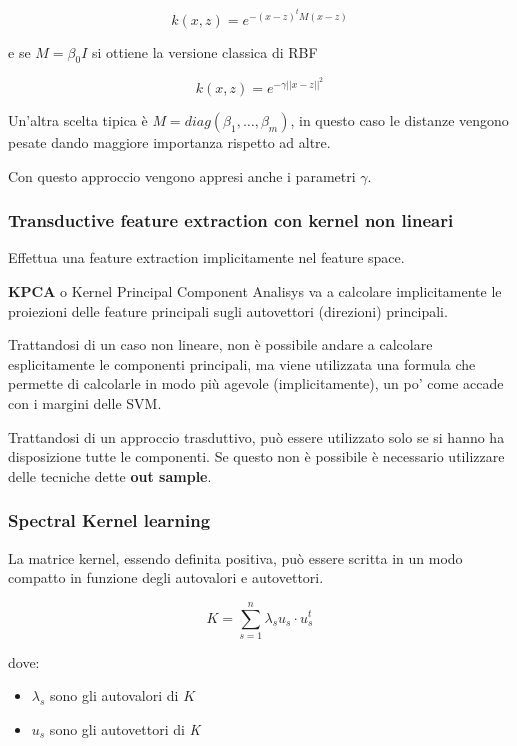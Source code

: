 $$
k(x,z) = e^{-(x-z)^t M(x-z)}
$$

e se $M = \beta_0 I$ si ottiene la versione classica di RBF

$$
k(x,z) =e^{-\gamma||x-z||^2}
$$

Un'altra scelta tipica è $M = diag(\beta_1, \ldots,\beta_m)$, in questo
caso le distanze vengono pesate dando maggiore importanza rispetto ad
altre.

Con questo approccio vengono appresi anche i parametri $\gamma$.

\subsubsection{Transductive feature extraction con kernel non
lineari}\label{transduction-feature-extraction-con-kernel-non-lineari}

Effettua una feature extraction implicitamente nel feature space.

\textbf{KPCA} o Kernel Principal Component Analisys va a calcolare
implicitamente le proiezioni delle feature principali sugli autovettori
(direzioni) principali.

Trattandosi di un caso non lineare, non è possibile andare a calcolare
esplicitamente le componenti principali, ma viene utilizzata una
formula che permette di calcolarle in modo più agevole
(implicitamente), un po' come accade con i margini delle SVM.

Trattandosi di un approccio trasduttivo, può essere utilizzato
solo se si hanno ha disposizione tutte le componenti. Se questo non è possibile è necessario utilizzare delle
tecniche dette \textbf{out sample}.

\subsubsection{Spectral Kernel learning}\label{spectral-kernel-learning}

La matrice kernel, essendo definita positiva, può essere scritta in un
modo compatto in funzione degli autovalori e autovettori.

$$
K = \sum_{s=1}^{n} \lambda_s u_s \cdot u_s^t
$$

dove:
\begin{itemize}
	\item $\lambda_s$ sono gli autovalori di $K$
	\item $u_s$ sono gli autovettori di \textit{K}
\end{itemize}

